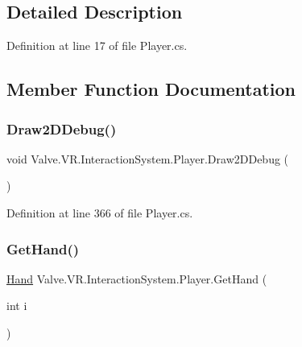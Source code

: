 \subsection{Detailed Description}


Definition at line 17 of file Player.\+cs.



\subsection{Member Function Documentation}
\mbox{\label{class_valve_1_1_v_r_1_1_interaction_system_1_1_player_a31a5b321202e3bd3b545c5545bf17b2b}} 
\subsubsection{\texorpdfstring{Draw2DDebug()}{Draw2DDebug()}}
{\footnotesize\ttfamily void Valve.\+V\+R.\+Interaction\+System.\+Player.\+Draw2\+D\+Debug (\begin{DoxyParamCaption}{ }\end{DoxyParamCaption})}



Definition at line 366 of file Player.\+cs.

\mbox{\label{class_valve_1_1_v_r_1_1_interaction_system_1_1_player_a35d109a7314c2be9516f393f1c2bbb42}} 
\subsubsection{\texorpdfstring{GetHand()}{GetHand()}}
{\footnotesize\ttfamily \mbox{\hyperlink{class_valve_1_1_v_r_1_1_interaction_system_1_1_hand}{Hand}} Valve.\+V\+R.\+Interaction\+System.\+Player.\+Get\+Hand (\begin{DoxyParamCaption}\item[{int}]{i }\end{DoxyParamCaption})}



